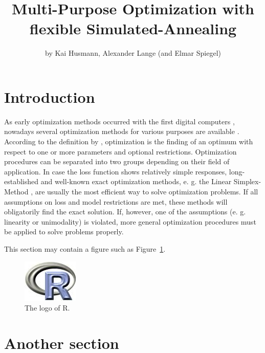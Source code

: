 \title{Multi-Purpose Optimization with flexible Simulated-Annealing}
\author{by Kai Husmann, Alexander Lange (and Elmar Spiegel)}

\maketitle


\section{Introduction}

As early optimization methods occurred with the first digital computers \citep{Corana.1987}, nowadays several optimization methods for various purposes are available \citep{Wegener.2005}. According to the definition by \citet{Pronzato.1984}, optimization is the finding of an optimum with respect to one or more parameters and optional restrictions. Optimization procedures can be separated into two groups depending on their field of application. In case the loss function shows relatively simple responses, long-established and well-known exact optimization methods, e. g. the Linear Simplex-Method \citep{Dantzig.1959}, are usually the most efficient way to solve optimization problems. If all assumptions on loss and model restrictions are met, these methods will obligatorily find the exact solution. If, however, one of the assumptions (e. g. linearity or unimodality) is violated, more general optimization procedures must be applied to solve problems properly.  



This section may contain a figure such as Figure~\ref{figure:rlogo}.

\begin{figure}[htbp]
  \centering
  \includegraphics{Fig/Rlogo}
  \caption{The logo of R.}
  \label{figure:rlogo}
\end{figure}

\section{Another section}

